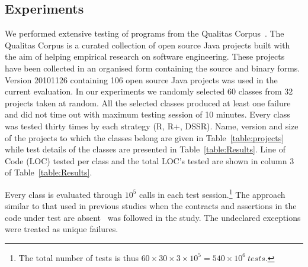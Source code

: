 \subsection{Experiments}
We performed extensive testing of programs from the Qualitas Corpus~\cite{tempero2010empirical}. The Qualitas Corpus is a curated collection of open source Java projects built with the aim of helping empirical research on  software engineering. These projects have been collected in an organised form containing the source and binary forms. Version 20101126 containing 106 open source Java projects was used in the current evaluation. In our experiments we randomly selected 60 classes from 32 projects taken at random. All the selected classes produced at least one failure and did not time out with maximum testing session of 10 minutes. Every class was tested thirty times by each strategy (R, R+, DSSR). Name, version and size of the projects to which the classes belong are given in Table~\ref{table:projects} while test details of the classes are presented in Table~\ref{table:Results}. Line of Code (LOC) tested per class and the total LOC's tested are shown in column 3 of Table~\ref{table:Results}. 

Every class is evaluated through $10^5$ calls in each test session.\footnote{The total number of tests is thus $60\times 30\times 3 \times 10^5 = 540\times 10^6~tests$.} 
The approach similar to that used in previous studies when the contracts and assertions in the code under test are absent~\cite{oriol2012random} was followed in the study. The undeclared exceptions were treated as unique failures.


